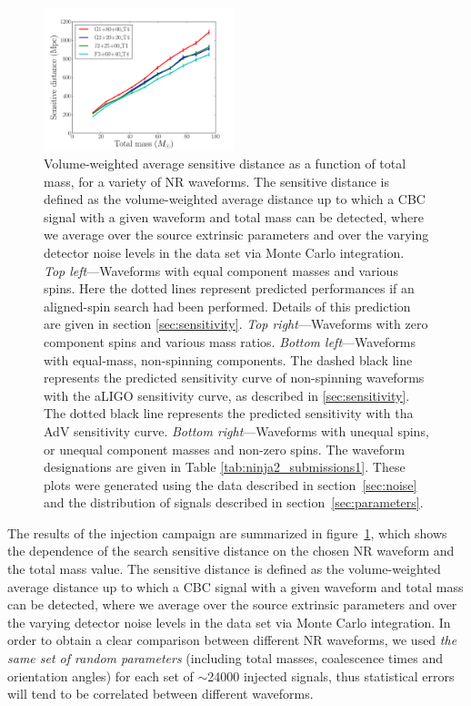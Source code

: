 \begin{figure}
\includegraphics[width=0.495\textwidth]
{papers/mdc2013_submission/figure11D}
\caption{\label{fig:sens_dists_1}
Volume-weighted average sensitive distance as a function of total mass, for a 
variety of NR waveforms. The sensitive distance is defined as the 
volume-weighted average distance 
up to which a CBC signal with a given waveform and total mass can be detected, 
where we average over the source extrinsic parameters and over the varying 
detector noise levels in the data set via Monte Carlo integration.
\emph{Top left}---Waveforms with equal component masses and various spins. Here 
the dotted lines represent predicted performances if an aligned-spin search had 
been performed. Details of this prediction are given in section 
\ref{sec:sensitivity}.
\emph{Top right}---Waveforms with zero component spins and various mass ratios.
\emph{Bottom left}---Waveforms with equal-mass, non-spinning components. The 
dashed black line represents the predicted sensitivity curve of non-spinning 
waveforms with the aLIGO sensitivity curve, as described in 
\ref{sec:sensitivity}. The dotted black line represents the predicted 
sensitivity with tha AdV sensitivity curve.
\emph{Bottom right}---Waveforms with unequal spins, or unequal component masses 
and non-zero spins.
The waveform designations are given in Table 
\ref{tab:ninja2_submissions1}. These plots were generated using the data 
described in section~\ref{sec:noise} and the distribution of signals described 
in section~\ref{sec:parameters}.}
\end{figure}

The results of the injection campaign are summarized in 
figure~\ref{fig:sens_dists_1}, which shows the dependence of the search
sensitive distance on the chosen NR waveform and the total mass value. 
The sensitive distance is defined as the volume-weighted average distance 
up to which a CBC signal with a given waveform and total mass can be detected, 
where we average over the source extrinsic parameters and over the varying 
detector noise levels in the data set via Monte Carlo integration. 
In order to obtain a clear comparison between different NR waveforms, we used
\emph{the same set of random parameters} (including total masses, coalescence
times and orientation angles) for each set of $\sim$24000 injected signals, thus
statistical errors will tend to be correlated between different waveforms.
 
